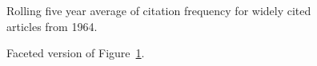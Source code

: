 \documentclass[
  10pt,
  letterpaper,
  DIV=11,
  numbers=noendperiod,
  twoside]{scrartcl}
\begin{document}
\begin{figure}


\caption{\label{fig-citation-spaghetti-1964}Rolling five year average of
citation frequency for widely cited articles from 1964.}

\end{figure}%

\begin{figure}


\caption{\label{fig-citation-facet-1964}Faceted version of
Figure~\ref{fig-citation-spaghetti-1964}.}

\end{figure}%
\end{document}
